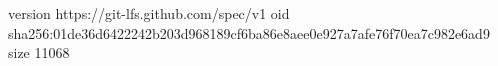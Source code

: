 version https://git-lfs.github.com/spec/v1
oid sha256:01de36d6422242b203d968189cf6ba86e8aee0e927a7afe76f70ea7c982e6ad9
size 11068
